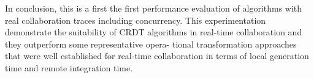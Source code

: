 In conclusion, this is a first the first performance evaluation of algorithms with real collaboration traces including concurrency. This experimentation demonstrate the suitability of CRDT algorithms in real-time collaboration and they outperform some representative opera- tional transformation approaches that were well established for real-time collaboration in terms of local generation time and remote integration time.
